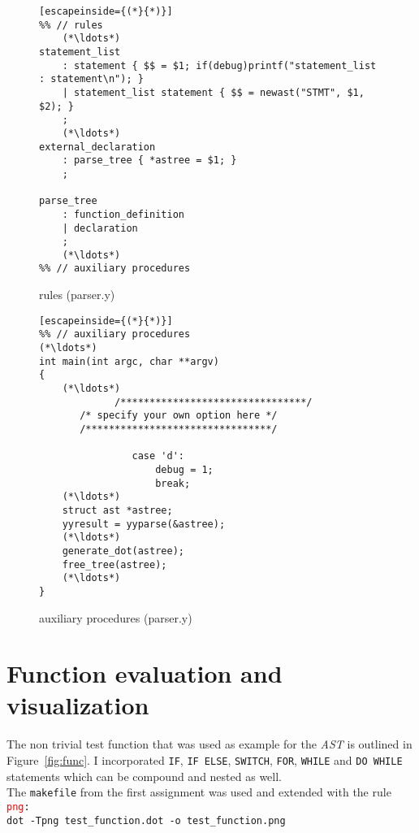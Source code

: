 \documentclass{scrartcl}
\begin{document}
\begin{figure}[H]
\begin{lstlisting}[escapeinside={(*}{*)}]
%% // rules
	(*\ldots*)
statement_list
	: statement	{ $$ = $1; if(debug)printf("statement_list : statement\n"); }
	| statement_list statement { $$ = newast("STMT", $1, $2); }
	;
	(*\ldots*)
external_declaration
	: parse_tree { *astree = $1; }
	;
	
parse_tree
	: function_definition
	| declaration
	;
	(*\ldots*)		
%% // auxiliary procedures
\end{lstlisting}
\caption{rules (parser.y)}
\label{lst:rules}
\end{figure}

\begin{figure}[H]
\begin{lstlisting}[escapeinside={(*}{*)}]
%% // auxiliary procedures
(*\ldots*)
int main(int argc, char **argv)
{
	(*\ldots*)
			 /********************************/
       /* specify your own option here */
       /********************************/					
				
				case 'd':
					debug = 1;
					break;
	(*\ldots*)	
	struct ast *astree;
	yyresult = yyparse(&astree);
	(*\ldots*)	
	generate_dot(astree);
	free_tree(astree);
	(*\ldots*)
}
\end{lstlisting}
\caption{auxiliary procedures (parser.y)}
\label{lst:auxprod}
\end{figure}

\section*{Function evaluation and visualization}

The non trivial test function that was used as example for the \textit{AST} is outlined in Figure~\ref{fig:func}. I incorporated \texttt{IF}, \texttt{IF ELSE}, \texttt{SWITCH}, \texttt{FOR}, \texttt{WHILE} and \texttt{DO WHILE} statements which can be compound and nested as well.\\

The \texttt{makefile} from the first assignment was used and extended with the rule\\

\texttt{\textcolor{red}{png}:}\\
\-\qquad \texttt{dot -Tpng  test\_function.dot -o test\_function.png}\\
\end{document}
